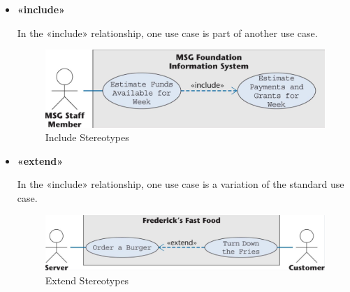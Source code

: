 \documentclass[11pt]{article}
\begin{document}
\begin{itemize}
	\item \textbf{«include»}
	
	In the «include» relationship, one use case is part of another use case.
	
	\begin{figure}[h]
		\centering
		\includegraphics[width=0.8\linewidth]{images/Include.png}
		\caption{Include Stereotypes}
		\label{fig:Include}
	\end{figure}

	\item \textbf{«extend»}
	
	In the «include» relationship, one use case is a variation of the standard use case.
	
	\begin{figure}[h]
		\centering
		\includegraphics[width=0.8\linewidth]{images/Extend.png}
		\caption{Extend Stereotypes}
		\label{fig:Extend}
	\end{figure}
\end{itemize}
\end{document}

